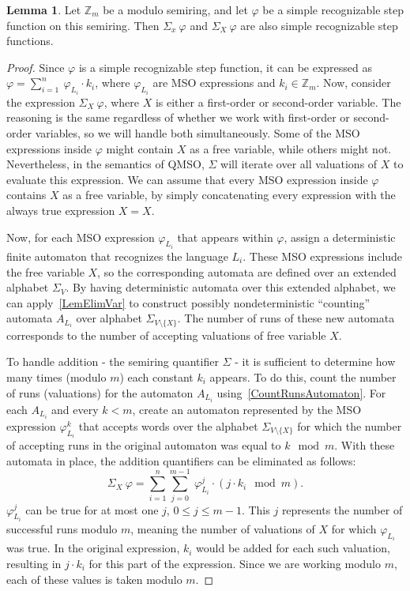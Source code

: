 \documentclass[12pt]{article}
\theoremstyle{definition}
\newtheorem{lemma}[theorem]{Lemma}
\begin{document}
\begin{lemma}
    \label{QuantElimAdd}
    Let $\mathbb{Z}_m$ be a modulo semiring, and let $\varphi$ be a simple recognizable step function on this semiring. Then $\Sigma_x \ \varphi$ and $\Sigma_X \ \varphi$ are also simple recognizable step functions.
\end{lemma}

\begin{proof}
    Since $\varphi$ is a simple recognizable step function, it can be expressed as $\varphi = \sum_{i = 1}^{n} \ \varphi_{L_i} \cdot k_i$, where $\varphi_{L_i}$ are MSO expressions and $k_i \in \mathbb{Z}_m$. Now, consider the expression $\Sigma_{X} \ \varphi$, where $X$ is either a first-order or second-order variable. The reasoning is the same regardless of whether we work with first-order or second-order variables, so we will handle both simultaneously. Some of the MSO expressions inside $\varphi$ might contain $X$ as a free variable, while others might not. Nevertheless, in the semantics of QMSO, $\Sigma$ will iterate over all valuations of $X$ to evaluate this expression. We can assume that every MSO expression inside $\varphi$ contains $X$ as a free variable, by simply concatenating every expression with the always true expression $X = X$.

    Now, for each MSO expression $\varphi_{L_i}$ that appears within $\varphi$, assign a deterministic finite automaton that recognizes the language $L_i$. These MSO expressions include the free variable $X$, so the corresponding automata are defined over an extended alphabet $\Sigma_V$. By having deterministic automata over this extended alphabet, we can apply~\cref{LemElimVar} to construct possibly nondeterministic ``counting'' automata $A_{L_i}$ over alphabet $\Sigma_{V \setminus \{X\}}$. The number of runs of these new automata corresponds to the number of accepting valuations of free variable $X$.

    To handle addition - the semiring quantifier $\Sigma$ - it is sufficient to determine how many times (modulo $m$) each constant $k_i$ appears. To do this, count the number of runs (valuations) for the automaton $A_{L_i}$ using~\cref{CountRunsAutomaton}. For each $A_{L_i}$ and every $k < m$, create an automaton represented by the MSO expression $\varphi_{L_i}^k$ that accepts words over the alphabet $\Sigma_{V \setminus \{X\}}$ for which the number of accepting runs in the original automaton was equal to $k \mod m$. With these automata in place, the addition quantifiers can be eliminated as follows:
    $$\Sigma_X \ \varphi = \sum_{i = 1}^n \sum_{j = 0}^{m-1} \ \varphi_{L_i}^j \cdot (j \cdot k_i \mod m).$$
    $\varphi_{L_i}^j$ can be true for at most one $j$, $0 \leq j \leq m-1$. This $j$ represents the number of successful runs modulo $m$, meaning the number of valuations of $X$ for which $\varphi_{L_i}$ was true. In the original expression, $k_i$ would be added for each such valuation, resulting in $j \cdot k_i$ for this part of the expression. Since we are working modulo $m$, each of these values is taken modulo $m$.
\end{proof}
\end{document}
